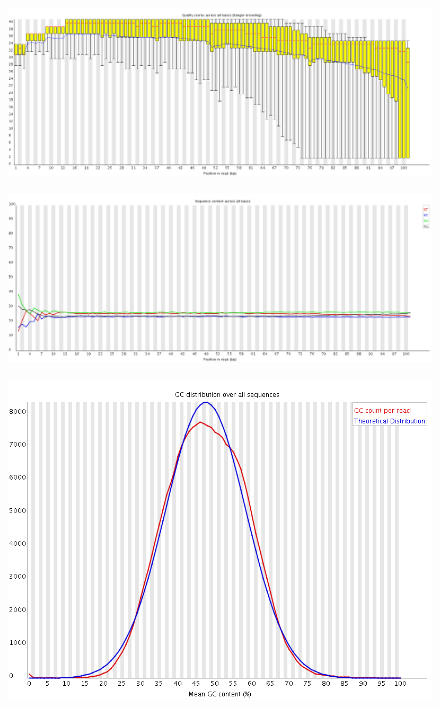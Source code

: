\documentclass{article}
\begin{document}
    \begin{figure}[htbp]
      \centering
      \includegraphics[width=1.0\linewidth] {fastqc/5_120719_BD158KACXX_2_nophix-sort-dup_fastqc/Images/per_base_quality.png}
      \caption{}
    \end{figure}
    \begin{figure}[htbp]
      \centering
      \includegraphics[width=0.85\linewidth] {fastqc/5_120719_BD158KACXX_2_nophix-sort-dup_fastqc/Images/per_base_sequence_content.png}
      \caption{}
    \end{figure}
    \begin{figure}[htbp]
      \centering
      \includegraphics[width=0.85\linewidth] {fastqc/5_120719_BD158KACXX_2_nophix-sort-dup_fastqc/Images/per_sequence_gc_content.png}
      \caption{}
    \end{figure}
\end{document}

